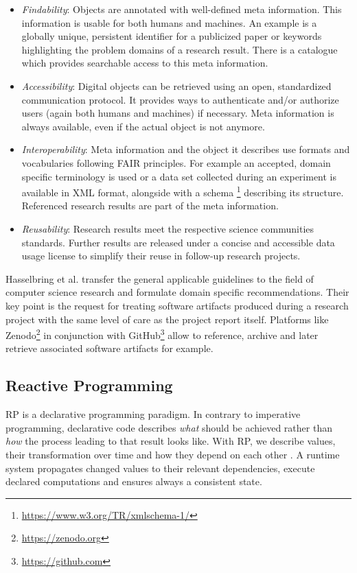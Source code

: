 \documentclass[12pt,a4paper]{article}
\begin{document}
\begin{itemize}
	\item \emph{Findability}: Objects are annotated with well-defined meta information. This information is usable for both humans and machines. An example is a globally unique, persistent identifier for a publicized paper or keywords highlighting the problem domains of a research result. There is a catalogue which provides searchable access to this meta information.
	\item \emph{Accessibility}: Digital objects can be retrieved using an open, standardized communication protocol. It provides ways to authenticate and/or authorize users (again both humans and machines) if necessary. Meta information is always available, even if the actual object is not anymore.
	\item \emph{Interoperability}: Meta information and the object it describes use formats and vocabularies following FAIR principles. For example an accepted, domain specific terminology is used or a data set collected during an experiment is available in XML format, alongside with a schema \footnote{\url{https://www.w3.org/TR/xmlschema-1/}} describing its structure. Referenced research results are part of the meta information.
	\item \emph{Reusability}: Research results meet the respective science communities standards. Further results are released under a concise and accessible data usage license to simplify their reuse in follow-up research projects.
\end{itemize}

Hasselbring et al. \cite{2019arXiv190805986H} transfer the general applicable guidelines to the field of computer science research and formulate domain specific recommendations. Their key point is the request for treating software artifacts produced during a research project with the same level of care as the project report itself. Platforms like Zenodo\footnote{\url{https://zenodo.org}} in conjunction with GitHub\footnote{\url{https://github.com}} allow to reference, archive and later retrieve associated software artifacts for example.

\subsection{Reactive Programming}
RP is a declarative programming paradigm. In contrary to imperative programming, declarative code describes \emph{what} should be achieved rather than \emph{how} the process leading to that result looks like. With RP, we describe values, their transformation over time and how they depend on each other \cite{8354906}. A runtime system propagates changed values to their relevant dependencies, execute declared computations and ensures always a consistent state.
\end{document}
